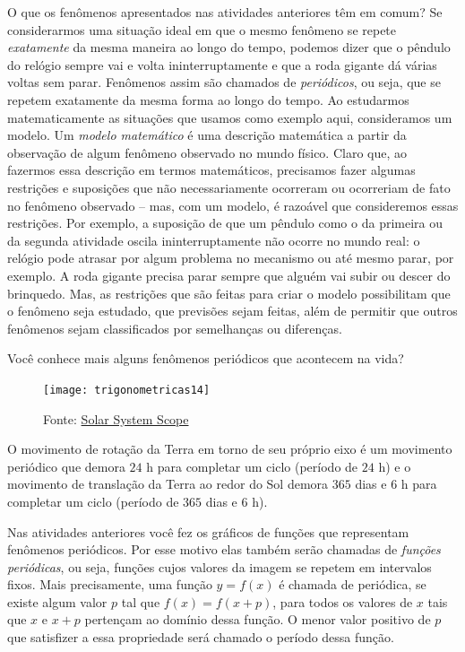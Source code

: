 O que os fenômenos apresentados nas atividades anteriores têm em comum? Se considerarmos uma situação ideal em que o mesmo fenômeno se repete \textit{exatamente} da mesma maneira ao longo do tempo, podemos dizer que o pêndulo do relógio sempre vai e volta ininterruptamente e que a roda gigante dá várias voltas sem parar. Fenômenos assim são chamados de \textit{periódicos}, ou seja, que se repetem exatamente da mesma forma ao longo do tempo. Ao estudarmos matematicamente as situações que usamos como exemplo aqui, consideramos um modelo. Um \textit{modelo matemático} é uma descrição matemática a partir da observação de algum fenômeno observado no mundo físico. Claro que, ao fazermos essa descrição em termos matemáticos, precisamos fazer algumas restrições e suposições que não necessariamente ocorreram ou ocorreriam de fato no fenômeno observado – mas, com um modelo, é razoável que consideremos essas restrições. Por exemplo, a suposição de que um pêndulo como o da primeira ou da segunda atividade oscila ininterruptamente não ocorre no mundo real: o relógio pode atrasar por algum problema no mecanismo ou até mesmo parar, por exemplo. A roda gigante precisa parar sempre que alguém vai subir ou descer do brinquedo. Mas, as restrições que são feitas para criar o modelo possibilitam que o fenômeno seja estudado, que previsões sejam feitas, além de permitir que outros fenômenos sejam classificados por semelhanças ou diferenças.

Você conhece mais alguns fenômenos periódicos que acontecem na vida?


\begin{figure}[H]
\centering

\texttt{[image: trigonometricas14]}
\caption{Fonte: \href{https://www.solarsystemscope.com/}{Solar System Scope}}
\label{}
\end{figure}

O movimento de rotação da Terra em torno de seu próprio eixo é um movimento periódico que demora $24$ h para completar um ciclo (período de $24$ h) e o movimento de translação da Terra ao redor do Sol demora $365$ dias e $6$ h para completar um ciclo (período de $365$ dias e $6$ h).

Nas atividades anteriores você fez os gráficos de funções que representam fenômenos periódicos. Por esse motivo elas também serão chamadas de \textit{funções periódicas}, ou seja, funções cujos valores da imagem se repetem em intervalos fixos. Mais precisamente, uma função $y=f(x)$ é chamada de periódica, se existe algum valor $p$ tal que $f(x)=f(x+p)$, para todos os valores de $x$ tais que $x$ e $x+p$ pertençam ao domínio dessa função. O menor valor positivo de $p$ que satisfizer a essa propriedade será chamado o período dessa função.

